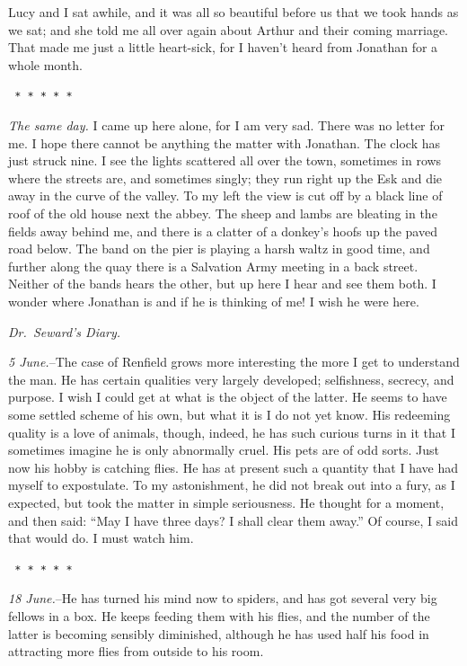 \documentclass[12pt,openright]{book}
\begin{document}
Lucy and I sat awhile, and it was all so beautiful before us that we took hands as we sat; and she told me all over again about Arthur and their coming marriage. That made me just a little heart-sick, for I haven’t heard from Jonathan for a whole month.

\texttt{   *       *       *       *       *}

\textit{The same day.} I came up here alone, for I am very sad. There was no letter for me. I hope there cannot be anything the matter with Jonathan. The clock has just struck nine. I see the lights scattered all over the town, sometimes in rows where the streets are, and sometimes singly; they run right up the Esk and die away in the curve of the valley. To my left the view is cut off by a black line of roof of the old house next the abbey. The sheep and lambs are bleating in the fields away behind me, and there is a clatter of a donkey’s hoofs up the paved road below. The band on the pier is playing a harsh waltz in good time, and further along the quay there is a Salvation Army meeting in a back street. Neither of the bands hears the other, but up here I hear and see them both. I wonder where Jonathan is and if he is thinking of me! I wish he were here.

\textit{Dr. Seward’s Diary.}

\textit{5 June.}–The case of Renfield grows more interesting the more I get to understand the man. He has certain qualities very largely developed; selfishness, secrecy, and purpose. I wish I could get at what is the object of the latter. He seems to have some settled scheme of his own, but what it is I do not yet know. His redeeming quality is a love of animals, though, indeed, he has such curious turns in it that I sometimes imagine he is only abnormally cruel. His pets are of odd sorts. Just now his hobby is catching flies. He has at present such a quantity that I have had myself to expostulate. To my astonishment, he did not break out into a fury, as I expected, but took the matter in simple seriousness. He thought for a moment, and then said: “May I have three days? I shall clear them away.” Of course, I said that would do. I must watch him.

\texttt{   *       *       *       *       *}

\textit{18 June.}–He has turned his mind now to spiders, and has got several very big fellows in a box. He keeps feeding them with his flies, and the number of the latter is becoming sensibly diminished, although he has used half his food in attracting more flies from outside to his room.
\end{document}

